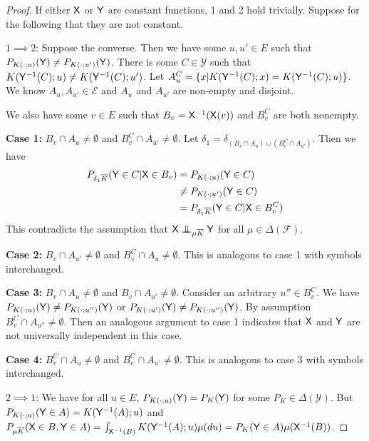 \begin{proof}
If either $\mathsf{X}$ or $\mathsf{Y}$ are constant functions, 1 and 2 hold trivially. Suppose for the following that they are not constant.

$1\implies 2$:
Suppose the converse. Then we have some $u,u'\in E$ such that $P_{K(\cdot;u)}(\mathsf{Y})\neq P_{K(\cdot;u')}(\mathsf{Y})$. There is some $C\in \mathcal{Y}$  such that $K(\mathsf{Y}^{-1}(C);u)\neq K(\mathsf{Y}^{-1}(C);u')$. Let $A^C_u=\{x|K(\mathsf{Y}^{-1}(C);x)=K(\mathsf{Y}^{-1}(C);u)\}$. We know $A_u, A_{u'}\in \mathcal{E}$ and $A_u$ and $A_{u'}$ are non-empty and disjoint.

We also have some $v\in E$ such that $B_v=\mathsf{X}^{-1}(\mathsf{X}(v))$ and $B_v^C$ are both nonempty.

\textbf{Case 1:} $B_v\cap A_u\neq \emptyset$ and $B_v^C \cap A_{u'}\neq \emptyset$. Let $\delta_1=\delta_{(B_v\cap A_u)\cup(B_v^C \cap A_{u'})}$. Then we have
\begin{align}
    P_{\delta_1\overline{K}}(\mathsf{Y}\in C|\mathsf{X}\in B_v) &= P_{K(\cdot;u)}(\mathsf{Y}\in C)\\
    &\neq P_{K(\cdot;u')}(\mathsf{Y}\in C)\\
    &=  P_{\delta_1\overline{K}}(\mathsf{Y}\in C|\mathsf{X}\in B^C_v)
\end{align}
This contradicts the assumption that $\RV{X}\CI_{\mu\overline{K}} \RV{Y}$ for all $\mu\in\Delta(\mathcal{F})$.

\textbf{Case 2:} $B_v\cap A_{u'}\neq \emptyset$ and $B_v^C \cap A_{u}\neq \emptyset$. This is analogous to case 1 with symbols interchanged.

\textbf{Case 3:} $B_v\cap A_u\neq \emptyset$ and $B_v \cap A_{u'}\neq \emptyset$. Consider an arbitrary $u''\in B_v^C$. We have $P_{K(\cdot;u)}(\mathsf{Y})\neq P_{K(\cdot;u'')}(\mathsf{Y})$ or $P_{K(\cdot;u')}(\mathsf{Y})\neq P_{K(\cdot;u'')}(\mathsf{Y})$. By assumption $B_v^C\cap A_{u''}\neq \emptyset$. Then an analogous argument to case 1 indicates that $\mathsf{X}$ and $\mathsf{Y}$ are not universally independent in this case.

\textbf{Case 4:} $B^C_v\cap A_u\neq \emptyset$ and $B^C_v \cap A_{u'}\neq \emptyset$. This is analogous to case 3 with symbols interchanged.

$2\implies 1$:
We have for all $u\in E$, $P_{K(\cdot;u)}(\mathsf{Y})=P_K(\mathsf{Y})$ for some $P_K\in \Delta(\mathcal{Y})$. But $P_{K(\cdot;u)}(\mathsf{Y}\in A) = K(\mathsf{Y}^{-1}(A);u)$ and $P_{\mu\overline{K}}(\mathsf{X}\in B,\mathsf{Y}\in A) = \int_{\mathsf{X}^{-1}(B)} K(\mathsf{Y}^{-1}(A);u) \mu(du)=P_K(\mathsf{Y}\in A)\mu(\mathsf{X}^{-1}(B))$.

\end{proof}

